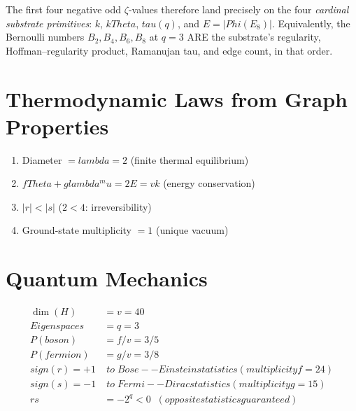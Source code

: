 \documentclass[12pt,a4paper]{article}
\def\mathcal#1{#1}%
\def\textbf#1{#1}%
\def\text#1{#1}%
\def\lambda{lambda}%
\def\mu{mu}%
\def\Phi#1{Phi#1}%
\def\tau{tau}%
\def\Theta{Theta}%
\def\cdot{ }%
\def\to{ to }%
\theoremstyle{definition}
\begin{document}
The first four negative odd $\zeta$-values therefore land precisely on
the four \emph{cardinal substrate primitives}: $k$, $k\Theta$, $\tau(q)$,
and $E = |\Phi(E_8)|$. Equivalently, the Bernoulli numbers
$B_2, B_4, B_6, B_8$ at $q=3$ ARE the substrate's regularity,
Hoffman--regularity product, Ramanujan tau, and edge count, in that order.


\section{Thermodynamic Laws from Graph Properties}
\label{sec:thermo}

\begin{enumerate}[label=\textbf{\arabic*$^{\text{th}}$ Law:},leftmargin=3.5cm]
\item[0$^{\text{th}}$ Law:] Diameter $=\lambda=2$ (finite thermal equilibrium)
\item[1$^{\text{st}}$ Law:] $f\Theta+g\lambda^\mu=2E=vk$ (energy conservation)
\item[2$^{\text{nd}}$ Law:] $|r|<|s|$ ($2<4$: irreversibility)
\item[3$^{\text{rd}}$ Law:] Ground-state multiplicity $=1$ (unique vacuum)
\end{enumerate}


\section{Quantum Mechanics}
\label{sec:qm}

\begin{equation}
\begin{aligned}
\dim(\mathcal{H}) &= v = 40 \\
\text{Eigenspaces} &= q = 3 \\
P(\text{boson}) &= f/v = 3/5 \\
P(\text{fermion}) &= g/v = 3/8 \\
\text{sign}(r) = +1 &\;\to\;\text{Bose--Einstein statistics (multiplicity }f=24\text{)} \\
\text{sign}(s) = -1 &\;\to\;\text{Fermi--Dirac statistics (multiplicity }g=15\text{)} \\
r\cdot s &= -2^q < 0 \;\;\text{(opposite statistics guaranteed)}
\end{aligned}
\end{equation}


\newpage
\end{document}
